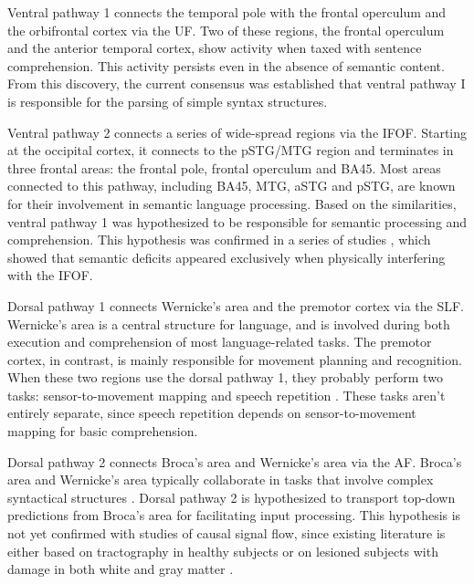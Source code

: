 Ventral pathway 1 connects the temporal pole with the frontal operculum and the orbifrontal cortex via the UF.
Two of these regions, the frontal operculum and the anterior temporal cortex, show activity when taxed with sentence comprehension.
This activity persists even in the absence of semantic content.
From this discovery, the current consensus was established that ventral pathway I is responsible for the parsing of simple syntax structures.

Ventral pathway 2 connects a series of wide-spread regions via the IFOF.
Starting at the occipital cortex, it connects to the pSTG/MTG region and terminates in three frontal areas: the frontal pole, frontal operculum and BA45.
Most areas connected to this pathway, including BA45, MTG, aSTG and pSTG, are known for their involvement in semantic language processing.
Based on the similarities, ventral pathway 1 was hypothesized to be responsible for semantic processing and comprehension.
This hypothesis was confirmed in a series of studies \cite{1.1.tracts.lesions, 1.1.tracts.interference.a, 1.1.tracts.interference.b}, which showed that semantic deficits appeared exclusively when physically interfering with the IFOF.

Dorsal pathway 1 connects Wernicke's area and the premotor cortex via the SLF.
Wernicke's area is a central structure for language, and is involved during both execution and comprehension of most language-related tasks.
The premotor cortex, in contrast, is mainly responsible for movement planning and recognition.
When these two regions use the dorsal pathway 1, they probably perform two tasks: sensor-to-movement mapping \cite{1.1.D1a} and speech repetition \cite{1.1.D1b}.
These tasks aren't entirely separate, since speech repetition depends on sensor-to-movement mapping for basic comprehension.

Dorsal pathway 2 connects Broca's area and Wernicke's area via the AF.
Broca's area and Wernicke's area typically collaborate in tasks that involve complex syntactical structures \cite{1.1.D1a}.
Dorsal pathway 2 is hypothesized to transport top-down predictions from Broca's area for facilitating input processing.
This hypothesis is not yet confirmed with studies of causal signal flow, since existing literature is either based on tractography in healthy subjects or on lesioned subjects with damage in both white and gray matter \cite{1.1.causality}.

